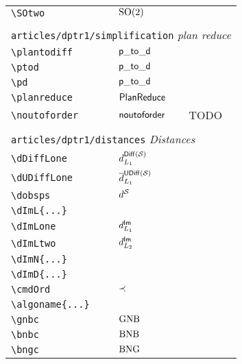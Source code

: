 \begin{longtable}{lll}
 {\color[rgb]{0.5,0.5,0.5}\texttt{\textbackslash SOtwo}} & $\mathrm{SO}(2)$ & \\ 
  &  & \\ 
 \multicolumn{3}{l}{{\color[rgb]{0.5,0.5,0.5}\texttt{articles/dptr1/simplification}} \emph{plan reduce}}\\ 
 \hline
{\color[rgb]{0.5,0.5,0.5}\texttt{\textbackslash plantodiff}} & $\mathsf{p\_to\_d}$ & \\ 
 {\color[rgb]{0.5,0.5,0.5}\texttt{\textbackslash ptod}} & $\mathsf{p\_to\_d}$ & \\ 
 {\color[rgb]{0.5,0.5,0.5}\texttt{\textbackslash pd}} & $\mathsf{p\_to\_d}$ & \\ 
 {\color[rgb]{0.5,0.5,0.5}\texttt{\textbackslash planreduce}} & $\mathsf{PlanReduce}$ & \\ 
 {\color[rgb]{0.5,0.5,0.5}\texttt{\textbackslash noutoforder}} & $\mathsf{noutoforder}$ &  TODO\\ 
  &  & \\ 
 \multicolumn{3}{l}{{\color[rgb]{0.5,0.5,0.5}\texttt{articles/dptr1/distances}} \emph{Distances}}\\ 
 \hline
{\color[rgb]{0.5,0.5,0.5}\texttt{\textbackslash dDiffLone}} & $\dDiffLone$ & \\ 
 {\color[rgb]{0.5,0.5,0.5}\texttt{\textbackslash dUDiffLone}} & $\dUDiffLone$ & \\ 
 {\color[rgb]{0.5,0.5,0.5}\texttt{\textbackslash dobsps}} & $\dobsps$ & \\ 
 {\color[rgb]{0.5,0.5,0.5}\texttt{\textbackslash dImL\{...\}}} &  & \\ 
 {\color[rgb]{0.5,0.5,0.5}\texttt{\textbackslash dImLone}} & $d^{\mathsf{Im}}_{L_{1}}$ & \\ 
 {\color[rgb]{0.5,0.5,0.5}\texttt{\textbackslash dImLtwo}} & $d^{\mathsf{Im}}_{L_{2}}$ & \\ 
 {\color[rgb]{0.5,0.5,0.5}\texttt{\textbackslash dImN\{...\}}} &  & \\ 
 {\color[rgb]{0.5,0.5,0.5}\texttt{\textbackslash dImD\{...\}}} &  & \\ 
 {\color[rgb]{0.5,0.5,0.5}\texttt{\textbackslash cmdOrd}} & $\prec$ & \\ 
 {\color[rgb]{0.5,0.5,0.5}\texttt{\textbackslash algoname\{...\}}} &  & \\ 
 {\color[rgb]{0.5,0.5,0.5}\texttt{\textbackslash gnbc}} & $\text{GNB}$ & \\ 
 {\color[rgb]{0.5,0.5,0.5}\texttt{\textbackslash bnbc}} & $\text{BNB}$ & \\ 
 {\color[rgb]{0.5,0.5,0.5}\texttt{\textbackslash bngc}} & $\text{BNG}$ & \\ 

\end{longtable}
